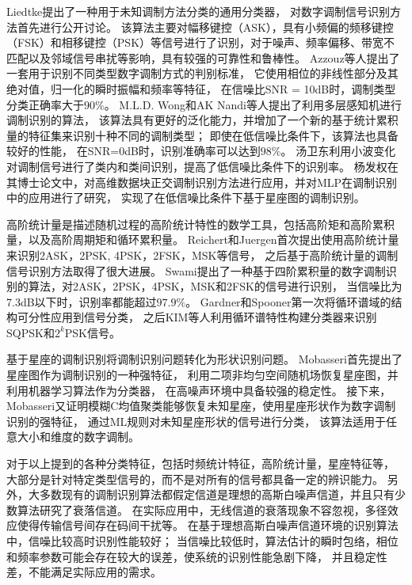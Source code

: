 Liedtke提出了一种用于未知调制方法分类的通用分类器，
对数字调制信号识别方法首先进行公开讨论\cite{liedtke1984computer}。 
该算法主要对幅移键控（ASK），具有小频偏的频移键控（FSK）和相移键控（PSK）等信号进行了识别，对于噪声、频率偏移、带宽不匹配以及邻域信号串扰等影响，具有较强的可靠性和鲁棒性。 
Azzouz等人提出了一套用于识别不同类型数字调制方式的判别标准，
它使用相位的非线性部分及其绝对值，归一化的瞬时振幅和频率等特征，
在信噪比SNR = 10dB时，调制类型分类正确率大于$90\%$\cite{azzouz1995automatic}。
M.L.D. Wong和AK Nandi等人提出了利用多层感知机进行调制识别的算法，
该算法具有更好的泛化能力，并增加了一个新的基于统计累积量的特征集来识别十种不同的调制类型；
即使在低信噪比条件下，该算法也具备较好的性能，
在SNR=0dB时，识别准确率可以达到$98\%$\cite{wong2001automatic}。
汤卫东利用小波变化对调制信号进行了类内和类间识别，提高了低信噪比条件下的识别率\cite{汤卫东2010基于小波变换的数字通信信号调制识别研究}。
杨发权在其博士论文中，对高维数据块正交调制识别方法进行应用，并对MLP在调制识别中的应用进行了研究，
实现了在低信噪比条件下基于星座图的调制识别\cite{杨发权2015无线通信信号调制识别关键技术与理论研究}。\par

高阶统计量是描述随机过程的高阶统计特性的数学工具，包括高阶矩和高阶累积量，以及高阶周期矩和循环累积量。
Reichert和Juergen首次提出使用高阶统计量来识别2ASK，2PSK, 4PSK，2FSK，MSK等信号，
之后基于高阶统计量的调制信号识别方法取得了很大进展\cite{reichert1992automatic}。
Swami提出了一种基于四阶累积量的数字调制识别的算法，对2ASK，2PSK，4PSK，MSK和2FSK的信号进行识别，
当信噪比为7.3dB以下时，识别率都能超过$97.9\%$\cite{swami2000hierarchical}。
Gardner和Spooner第一次将循环谱域的结构可分性应用到信号分类，
之后KIM等人利用循环谱特性构建分类器来识别SQPSK和$2^k$PSK信号。\par

基于星座的调制识别将调制识别问题转化为形状识别问题。
Mobasseri首先提出了星座图作为调制识别的一种强特征，
利用二项非均匀空间随机场恢复星座图，并利用机器学习算法作为分类器，
在高噪声环境中具备较强的稳定性\cite{mobasseri1999constellation}。
接下来，Mobasseri又证明模糊C均值聚类能够恢复未知星座，使用星座形状作为数字调制识别的强特征，
通过ML规则对未知星座形状的信号进行分类，
该算法适用于任意大小和维度的数字调制\cite{mobasseri2000digital}。\par
 
对于以上提到的各种分类特征，包括时频统计特征，高阶统计量，星座特征等，
大部分是针对特定类型信号的，而不是对所有的信号都具备一定的辨识能力。
另外，大多数现有的调制识别算法都假定信道是理想的高斯白噪声信道，并且只有少数算法研究了衰落信道。
在实际应用中，无线信道的衰落现象不容忽视，多径效应使得传输信号间存在码间干扰等。
在基于理想高斯白噪声信道环境的识别算法中，信噪比较高时识别性能较好；
当信噪比较低时，算法估计的瞬时包络，相位和频率参数可能会存在较大的误差，使系统的识别性能急剧下降，
并且稳定性差，不能满足实际应用的需求。\par

